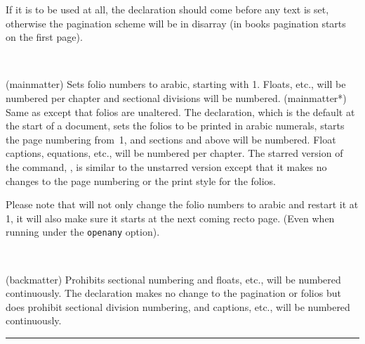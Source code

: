     If it is to be used at all, the \cmd{\frontmatter} declaration should
come before any text is set, otherwise the pagination scheme will be
in disarray (in books pagination starts on the first page).

\begin{syntax}
\cmd{\mainmatter} \cmd{\mainmatter*} \\
\end{syntax}
\glossary(mainmatter)%
  {}%
  {Sets folio numbers to arabic, starting with 1. Floats, etc., will be
   numbered per chapter and sectional divisions will be numbered.}
\glossary(mainmatter*)%
  {}%
  {Same as  except that folios are unaltered.}
The \cmd{\mainmatter} declaration, which is the default at the start of a
document, sets the folios to be printed in arabic numerals, starts
the page numbering from~1, and sections and above will be numbered.
Float captions, equations, etc., will be numbered
per chapter. The starred version of the command,
\cmd{\mainmatter*}, is similar to the unstarred version except that it
makes no changes to the page numbering or the print style for the
folios.

Please note that \cmd{\mainmatter} will not only change the folio
numbers to arabic and restart it at 1, it will also make sure it
starts at the next coming recto page. (Even when running under the
\texttt{openany} option).



\begin{syntax}
\cmd{\backmatter} \\
\end{syntax}
\glossary(backmatter)%
  {}%
  {Prohibits sectional numbering and floats, etc., will be numbered continuously.}
The \cmd{\backmatter} declaration makes no change to the pagination or
folios but does prohibit sectional division numbering, and
captions, etc., will be numbered continuously.

\fancybreak{}


